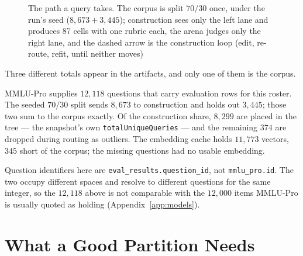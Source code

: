 \begin{figure}[htbp]
\caption[The pipeline from corpus to validated ranking]{The path a
query takes. The corpus is split $70/30$ once, under the run's seed
($8{,}673 + 3{,}445$); construction sees only the left lane and
produces 87 cells with one rubric each, the arena judges only the
right lane, and the dashed arrow is the construction loop (edit,
re-route, refit, until neither moves)}
\label{fig:pipeline}
\end{figure}

Three different totals appear in the artifacts, and only one of them is
the corpus.

MMLU-Pro supplies $12{,}118$ questions that carry evaluation rows for
this roster. The seeded $70/30$ split sends $8{,}673$ to construction and
holds out $3{,}445$; those two sum to the corpus exactly. Of the
construction share, $8{,}299$ are placed in the tree --- the snapshot's
own \texttt{totalUniqueQueries} --- and the remaining $374$ are dropped
during routing as outliers. The embedding cache holds $11{,}773$ vectors,
$345$ short of the corpus; the missing questions had no usable
embedding.

Question identifiers here are \texttt{eval\_results.question\_id}, not
\texttt{mmlu\_pro.id}. The two occupy different spaces and resolve to
different questions for the same integer, so the $12{,}118$ above is not
comparable with the $12{,}000$ items MMLU-Pro is usually quoted as
holding (Appendix~\ref{app:models}).

\section{What a Good Partition Needs}\label{sec:arch-requirements}

